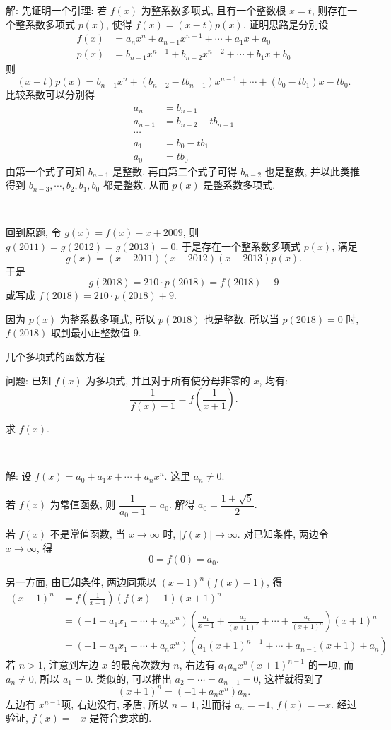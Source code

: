 解: 先证明一个引理: 若 $f(x)$ 为整系数多项式, 且有一个整数根 $x=t$, 则存在一个整系数多项式 $p(x)$, 使得 $f(x)=(x-t)p(x)$. 证明思路是分别设 
\begin{align*} 
f(x) &= a_nx^n+a_{n-1}x^{n-1}+\cdots+a_1x+a_0 \\
p(x) &= b_{n-1}x^{n-1}+b_{n-2}x^{n-2}+\cdots+b_1x+b_0 
\end{align*}
则
\[(x-t)p(x) = b_{n-1}x^n + (b_{n-2}-tb_{n-1})x^{n-1}+\cdots+ (b_0-tb_1)x - tb_0 .\]
比较系数可以分别得
\begin{align*} 
a_n &= b_{n-1}  \\
a_{n-1} &= b_{n-2}-tb_{n-1} \\
\cdots & \\
a_1 &= b_0-tb_1\\
a_0 &= tb_0
\end{align*}
由第一个式子可知 $b_{n-1}$ 是整数, 再由第二个式子可得 $b_{n-2}$ 也是整数, 并以此类推得到 $b_{n-3},\cdots,b_2,b_1,b_0$ 都是整数. 从而 $p(x)$ 是整系数多项式.

~

回到原题, 令 $g(x) = f(x) - x + 2009$, 则 $g(2011) = g(2012) = g(2013) = 0$. 于是存在一个整系数多项式 $p(x)$, 满足
\[ g(x) = (x-2011)(x-2012)(x-2013)p(x) .\]
于是 
$$g(2018) = 210\cdot p(2018) = f(2018)-9$$ 
或写成 $f(2018) = 210\cdot p(2018) + 9$.

因为 $p(x)$ 为整系数多项式, 所以 $p(2018)$ 也是整数. 所以当 $p(2018)=0$ 时, $f(2018)$ 取到最小正整数值 $9$.

\newpage
\noindent 几个多项式的函数方程

问题: 已知 $f(x)$ 为多项式, 并且对于所有使分母非零的 $x$, 均有:
\[ \frac{1}{f(x)-1} = f(\frac{1}{x+1}). \]

求 $f(x)$.

~

解: 设 $f(x) = a_0 + a_1x + \cdots + a_nx^n$. 这里 $a_n\neq 0$.

若 $f(x)$ 为常值函数, 则 $\dfrac{1}{a_0-1}=a_0$. 解得 $a_0 = \dfrac{1\pm\sqrt{5}}{2}$.

若 $f(x)$ 不是常值函数, 当 $x\to\infty$ 时, $|f(x)|\to\infty$. 对已知条件, 两边令 $x\to \infty$, 得
\[0 = f(0) = a_0.\]

另一方面, 由已知条件, 两边同乘以 $(x+1)^n(f(x)-1)$, 得
\begin{align*}
(x+1)^n &= f(\frac{1}{x+1})(f(x)-1)(x+1)^n \\
&= (-1+a_1x_1+\cdots+a_nx^n)(\frac{a_1}{x+1}+\frac{a_2}{(x+1)^2}+\cdots+\frac{a_n}{(x+1)^n})(x+1)^n\\
&= (-1+a_1x_1+\cdots+a_nx^n)(a_1(x+1)^{n-1}+\cdots+a_{n-1}(x+1)+a_n)
\end{align*}
若 $n > 1$, 注意到左边 $x$ 的最高次数为 $n$, 右边有 $a_1a_nx^n(x+1)^{n-1}$ 的一项, 而 $a_n\neq 0$, 所以 $a_1=0$. 类似的, 可以推出 $a_2=\cdots=a_{n-1}=0$, 这样就得到了
\[(x+1)^n = (-1+a_nx^n)a_n .\]
左边有 $x^{n-1}$项, 右边没有, 矛盾, 所以 $n=1$, 进而得 $a_n=-1$, $f(x)=-x$. 经过验证, $f(x)=-x$ 是符合要求的.

